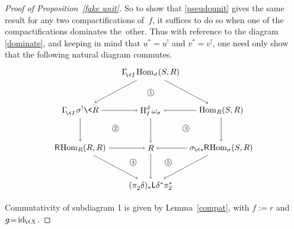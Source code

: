 \documentclass{compositio}
\theoremstyle{plain}
\theoremstyle{definition}
\theoremstyle{remark}
\numberwithin{equation}{thm}
\begin{document}
\begin{proof}[Proof of Proposition~\ref{fake unit}]
So to show that \eqref{pseudounit} gives the same result for any two compactifications of~$f$, it suffices to do so
when one of the compactifications dominates the~other.
Thus with reference to the diagram \eqref{dominate}, and keeping in mind that $u^*=u^!$ and $v^*=v^!$, one need only show that the following natural
diagram commutes.
\[

 \begin{tikzpicture}[xscale=3, yscale=1.6]

   \node(12) at (2,-1){$\Gamma^{}_{\!{\mkern-1mu}\<I}{\mkern-1mu}\operatorname{Hom}_\sigma(S,R)$};   
  
   \node(21) at (1,-2){$\Gamma^{}_{\!{\mkern-1mu}\<I}{\mkern1mu}{\mkern1mu}\sigma^!\<R$};
   \node(22) at (2,-2){$\textup{H}^d_I\,\omega_\sigma$};
   \node(23) at (3,-2){$\operatorname{Hom}_R(S,R)$};
   
   \node(31) at (1,-3){${\mathsf R}{\mkern-1mu}{\mkern-1mu}\operatorname{Hom}_R(R,R)$};
   \node(32) at (2,-3){$R$};
   \node(33) at (3,-3){$\sigma_{{\mkern-1mu}\<*}{\mathsf R}{\mkern-1mu}{\mkern-1mu}\operatorname{Hom}_\sigma(S,R)$};
   
   \node(42) at (2,-4){$(\pi^{}_2\delta)_*{\mathsf L}\delta^*\pi_2^*$};   
   

  
   \draw[->] (21)--(22) ;
   \draw[->] (23)--(22) ;  
   
    \draw[->] (31)--(32) ;
   \draw[->] (33)--(32) ; 
   
 
   \draw[->] (21)--(31) ;
   
   \draw[->] (22)--(32) ;
   \draw[->] (32)--(42) ;
 
   \draw[->] (23)--(33) ;
   
  
 
   \draw[->] (12)--(21) node[right=1pt, midway, scale=.75]{$ $}; 
   \draw[->] (12)--(23) ;    
 
    \draw[->] (31)--(42) node[right=1pt, midway, scale=.75]{$ $}; 
    \draw[->] (33)--(42) ;    
    
 
   \node at (2,-1.55)[scale=.9]{{\textcircled{\scriptsize{1}}}};
   \node at (1.5,-2.5)[scale=.9]{{\textcircled{\scriptsize{2}}}};
   \node at (2.5,-2.5)[scale=.9]{{\textcircled{\scriptsize{3}}}};   
   \node at (1.75,-3.4)[scale=.9]{{\textcircled{\scriptsize{4}}}}; 
   \node at (2.25,-3.4)[scale=.9]{{\textcircled{\scriptsize{5}}}};      
     
  \end{tikzpicture}
\]

Commutativity of subdiagram {\textcircled{\scriptsize{1}}} is given by Lemma~\ref{compat}, with $f{\!:=} r$ and $g{\!:=}\operatorname{id}_{{{\mkern-1mu}\<X}}$.


\end{proof}
\end{document}
